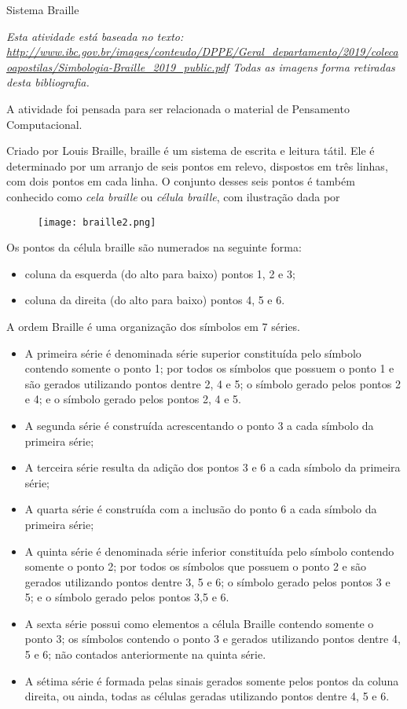 \begin{task}{Sistema Braille}

\textit{Esta atividade está baseada no texto: 
 \url{http://www.ibc.gov.br/images/conteudo/DPPE/Geral_departamento/2019/colecaoapostilas/Simbologia-Braille_2019_public.pdf} Todas as imagens forma retiradas desta bibliografia.}
 
 
 A atividade foi pensada para ser relacionada o material de Pensamento Computacional.
 
 
 
 Criado por Louis Braille, braille é um sistema de escrita e leitura tátil. Ele é determinado por um arranjo de seis pontos em relevo, dispostos em três linhas, com dois pontos em cada linha. O conjunto desses seis pontos é também conhecido como \textit{cela braille} ou \textit{célula braille}, com ilustração dada por  

\begin{figure}[H]
\centering

\texttt{[image: braille2.png]}
\end{figure}

Os pontos da célula braille são numerados na seguinte forma:

\begin{itemize}
    \item coluna da esquerda (do alto para baixo) pontos 1, 2 e 3;
    \item coluna da direita (do alto para baixo) pontos 4, 5 e 6.
\end{itemize}
A ordem Braille é uma organização dos símbolos em 7 séries.
\begin{itemize}
    \item A primeira série é denominada série superior constituída pelo símbolo contendo somente o ponto 1; por todos os símbolos que possuem o ponto 1 e são gerados utilizando pontos dentre 2, 4 e 5; o símbolo gerado pelos pontos 2 e 4; e o símbolo gerado pelos pontos 2, 4 e 5.
    \item A segunda série é construída acrescentando o ponto 3 a cada símbolo da primeira série;
    \item A terceira série resulta da adição dos pontos 3 e 6 a cada símbolo da primeira série;
    \item A quarta série é construída com a inclusão do ponto 6 a cada símbolo da primeira série;
    \item A quinta série é denominada série inferior constituída pelo símbolo contendo somente o ponto 2; por todos os símbolos que possuem o ponto 2 e são gerados utilizando pontos dentre 3, 5 e 6; o símbolo gerado pelos pontos 3 e 5; e o símbolo gerado pelos pontos 3,5 e 6.
    \item A sexta série possui como elementos a célula Braille contendo somente o ponto 3; os símbolos contendo o ponto 3 e gerados utilizando pontos dentre 4, 5 e 6; não contados anteriormente na quinta série.
    \item A sétima série é formada pelas sinais gerados somente pelos pontos da coluna direita, ou ainda, todas as células geradas utilizando pontos dentre 4, 5 e $6.$
    

\end{itemize}
\end{task}
